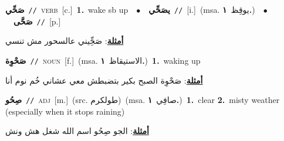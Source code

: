 \documentclass[10pt,a4paper,twoside]{article} %
\begin{document}
\begin{multicols}{2}
{{{{{{{{{{{{\setlength\topsep{0pt}\textbf{\foreignlanguage{arabic}{صَحِّي}}\ {\color{gray}\texttt{//}\color{black}}\ \textsc{verb}\ [c.]\ \textbf{1.}~wake sb up\ \ $\bullet$\ \ \setlength\topsep{0pt}\textbf{\foreignlanguage{arabic}{يصَحِّي}}\ {\color{gray}\texttt{//}\color{black}}\ [i.]\ \color{gray}(msa. \foreignlanguage{arabic}{يوقِظ}~\foreignlanguage{arabic}{\textbf{١.}})\color{black}\ \ $\bullet$\ \ \setlength\topsep{0pt}\textbf{\foreignlanguage{arabic}{صَحَّى}}\ {\color{gray}\texttt{//}\color{black}}\ [p.]\  \begin{flushright}\color{gray}\foreignlanguage{arabic}{\textbf{\underline{\foreignlanguage{arabic}{أمثلة}}}: صَحِِّيني عالسحور مش تنسي}\end{flushright}\color{black}} \vspace{2mm}

{\setlength\topsep{0pt}\textbf{\foreignlanguage{arabic}{صَحْوِة}}\ {\color{gray}\texttt{//}\color{black}}\ \textsc{noun}\ [f.]\ \color{gray}(msa. \foreignlanguage{arabic}{الاستيقاظ}~\foreignlanguage{arabic}{\textbf{١.}})\color{black}\ \textbf{1.}~waking up\  \begin{flushright}\color{gray}\foreignlanguage{arabic}{\textbf{\underline{\foreignlanguage{arabic}{أمثلة}}}: صَحْوِة الصبح بكير بتضبطش معي عشاني خُم نوم أنا}\end{flushright}\color{black}} \vspace{2mm}

{\setlength\topsep{0pt}\textbf{\foreignlanguage{arabic}{صِحُو}}\ {\color{gray}\texttt{//}\color{black}}\ \textsc{adj}\ [m.]\ (src. \color{gray}\foreignlanguage{arabic}{طولكرم}\color{black})\ \color{gray}(msa. \foreignlanguage{arabic}{صافِي}~\foreignlanguage{arabic}{\textbf{١.}})\color{black}\ \textbf{1.}~clear  \textbf{2.}~misty weather (especially when it stops raining)\  \begin{flushright}\color{gray}\foreignlanguage{arabic}{\textbf{\underline{\foreignlanguage{arabic}{أمثلة}}}: الجو صِحُو اسم الله شغل هش ونش}\end{flushright}\color{black}} \vspace{2mm}

}}}}}}}}}}}
\end{multicols}
\end{document}
